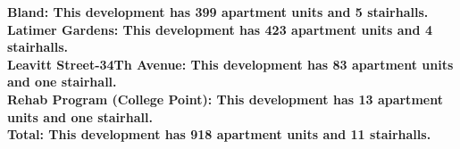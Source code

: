\bf{Bland}: This development has 399 apartment units and 5 stairhalls.\\\bf{Latimer Gardens}: This development has 423 apartment units and 4 stairhalls.\\\bf{Leavitt Street-34Th Avenue}: This development has 83 apartment units and one stairhall.\\\bf{Rehab Program (College Point)}: This development has 13 apartment units and one stairhall.\\\bf{Total}: This development has 918 apartment units and 11 stairhalls.\\